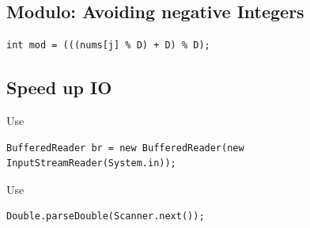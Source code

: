\documentclass[10pt,a4paper,ngerman,oneside,]{article}
\begin{document}
\begin{multicols}{2}
\subsection{Modulo: Avoiding negative Integers}
\begin{lstlisting}
int mod = (((nums[j] % D) + D) % D);
\end{lstlisting}

\subsection{Speed up IO}
Use
\begin{lstlisting}
BufferedReader br = new BufferedReader(new
InputStreamReader(System.in));
\end{lstlisting}
Use
\begin{lstlisting}
Double.parseDouble(Scanner.next());
\end{lstlisting}
\end{multicols}

%
\end{document}
